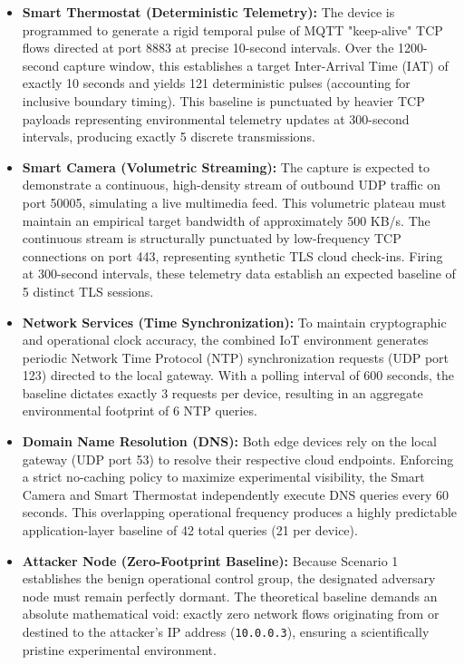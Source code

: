 \begin{itemize}
	\item \textbf{Smart Thermostat (Deterministic Telemetry):} The device is programmed to generate a rigid temporal pulse of MQTT "keep-alive" TCP flows directed at port 8883 at precise 10-second intervals. Over the 1200-second capture window, this establishes a target Inter-Arrival Time (IAT) of exactly 10 seconds and yields 121 deterministic pulses (accounting for inclusive boundary timing). This baseline is punctuated by heavier TCP payloads representing environmental telemetry updates at 300-second intervals, producing exactly 5 discrete transmissions.
	
	\item \textbf{Smart Camera (Volumetric Streaming):} The capture is expected to demonstrate a continuous, high-density stream of outbound UDP traffic on port 50005, simulating a live multimedia feed. This volumetric plateau must maintain an empirical target bandwidth of approximately 500 KB/s. The continuous stream is structurally punctuated by low-frequency TCP connections on port 443, representing synthetic TLS cloud check-ins. Firing at 300-second intervals, these telemetry data establish an expected baseline of 5 distinct TLS sessions.
	
	\item \textbf{Network Services (Time Synchronization):} To maintain cryptographic and operational clock accuracy, the combined IoT environment generates periodic Network Time Protocol (NTP) synchronization requests (UDP port 123) directed to the local gateway. With a polling interval of 600 seconds, the baseline dictates exactly 3 requests per device, resulting in an aggregate environmental footprint of 6 NTP queries.
	
	\item \textbf{Domain Name Resolution (DNS):} Both edge devices rely on the local gateway (UDP port 53) to resolve their respective cloud endpoints. Enforcing a strict no-caching policy to maximize experimental visibility, the Smart Camera and Smart Thermostat independently execute DNS queries every 60 seconds. This overlapping operational frequency produces a highly predictable application-layer baseline of 42 total queries (21 per device).
	
	\item \textbf{Attacker Node (Zero-Footprint Baseline):} Because Scenario 1 establishes the benign operational control group, the designated adversary node must remain perfectly dormant. The theoretical baseline demands an absolute mathematical void: exactly zero network flows originating from or destined to the attacker's IP address (\texttt{10.0.0.3}), ensuring a scientifically pristine experimental environment.
\end{itemize}
	
